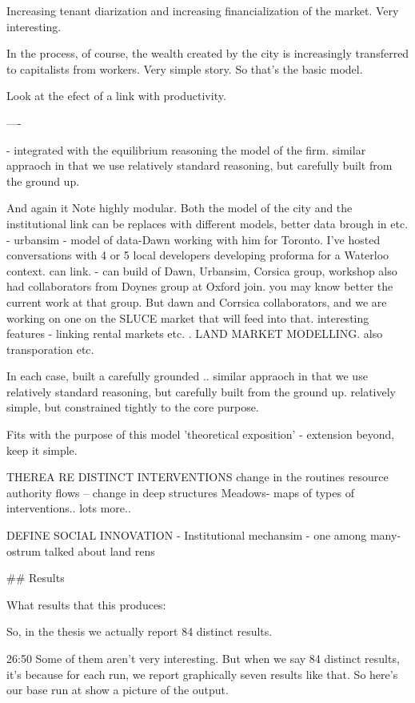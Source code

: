 \documentclass[]{article}
\begin{document}
Increasing tenant diarization and increasing financialization of the market. Very interesting.

In the process, of course, the wealth created by the city is increasingly transferred to capitalists from workers. Very simple story.
So that's the basic model.

Look at the efect of a link with productivity.

----

- integrated with the equilibrium reasoning the model of the firm.
 similar appraoch in that we use relatively standard reasoning, but carefully built from the ground up. 

And again it Note highly modular. Both the model of the city and the institutional link can be replaces with different models, better data brough in etc. - urbansim - model of data-Dawn working with him for Toronto. I've hosted conversations with 4 or 5 local developers developing proforma for a Waterloo context.  can link. 
- can build of Dawn, Urbansim, Corsica group, workshop also had collaborators from Doynes group at Oxford join. you may know better the current work at that group. But dawn and Corrsica collaborators, and we are working on one on the SLUCE market that will feed into that. interesting features - linking rental markets etc. .
LAND MARKET MODELLING.
also transporation etc.

In each case, built a carefully grounded .. similar appraoch in that we use relatively standard reasoning, but carefully built from the ground up. 
relatively simple, but constrained tightly to the core purpose.

Fits with the purpose of this model 'theoretical exposition' - extension beyond, keep it simple.

THEREA RE DISTINCT INTERVENTIONS
change in the routines resource authority flows -- change in deep structures
Meadows- maps of types of interventions.. lots more.. 

DEFINE SOCIAL INNOVATION - 
Institutional mechansim - one among many- ostrum talked about land rens



## Results


What results that this produces:

So, in the thesis we actually report 84 distinct results.

26:50
Some of them aren't very interesting. But when we say 84 distinct results, it's because for each run, we report graphically seven results like that. So here's our base run at show a picture of the output.
\end{document}
